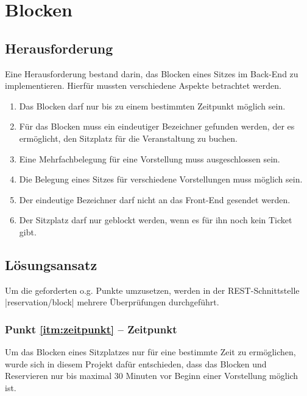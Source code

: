 \section{Blocken}
\label{sec:blocken}

\subsection{Herausforderung}
\label{ssec:herausforderung_blocken}

Eine Herausforderung bestand darin, das Blocken eines Sitzes im Back-End zu implementieren.
Hierfür mussten verschiedene Aspekte betrachtet werden.

\begin{enumerate}
\label{enum:blocken}
\item \label{itm:zeitpunkt}Das Blocken darf nur bis zu einem bestimmten Zeitpunkt möglich sein.
\item \label{itm:bezeichner}Für das Blocken muss ein eindeutiger Bezeichner gefunden werden, der es ermöglicht, den Sitzplatz für die Veranstaltung zu buchen.
\item \label{itm:mehr_eine_vorstellung}Eine Mehrfachbelegung für eine Vorstellung muss ausgeschlossen sein.
\item \label{itm:mehr_mehrere_vorstellungen}Die Belegung eines Sitzes für verschiedene Vorstellungen muss möglich sein.
\item \label{itm:front_end} Der eindeutige Bezeichner darf nicht an das Front-End gesendet werden.
\item \label{itm:ticket} Der Sitzplatz darf nur geblockt werden, wenn es für ihn noch kein Ticket gibt.
\end{enumerate}

\subsection{Lösungsansatz}
\label{ssec:loesung_blocken}

Um die geforderten o.g. Punkte umzusetzen, werden in der \acs{REST}-Schnittstelle \jinline |reservation/block| mehrere Überprüfungen durchgeführt.

\subsubsection*{Punkt \ref{itm:zeitpunkt} -- Zeitpunkt}
\label{ssssec:Zeitpunkt}
Um das Blocken eines Sitzplatzes nur für eine bestimmte Zeit zu ermöglichen, wurde sich in diesem Projekt dafür entschieden, dass das Blocken und Reservieren nur bis maximal 30 Minuten vor Beginn einer Vorstellung möglich ist.

